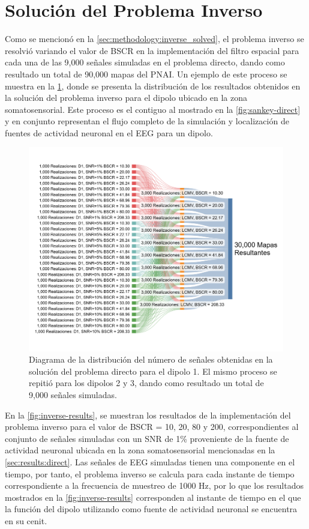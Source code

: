 \section{Solución del Problema Inverso}
\label{sec:results:inverse}

Como se mencionó en la \cref{sec:methodology:inverse_solved}, el problema inverso se resolvió variando el valor de BSCR en la implementación del filtro espacial para cada una de las 9,000 señales simuladas en el problema directo, dando como resultado un total de 90,000 mapas del PNAI.
Un ejemplo de este proceso se muestra en la \cref{fig:sankey-inverse}, donde se presenta la distribución de los resultados obtenidos en la solución del problema inverso para el dipolo ubicado en la zona somatosensorial. 
Este proceso es el contiguo al mostrado en la \cref{fig:sankey-direct} y en conjunto representan el flujo completo de la simulación y localización de fuentes de actividad neuronal en el EEG para un dipolo.

\begin{figure}[!b]
    \centering
    \includegraphics[width=\textwidth]{gfx/sankey-inverse.png}
    \caption{Diagrama de la distribución del número de señales obtenidas en la solución del problema directo para el dipolo 1. El mismo proceso se repitió para los dipolos 2 y 3, dando como resultado un total de 9,000 señales simuladas.}
    \label{fig:sankey-inverse}
\end{figure}

En la \cref{fig:inverse-results}, se muestran los resultados de la implementación del problema inverso para el valor de BSCR = 10, 20, 80 y 200, correspondientes al conjunto de señales simuladas con un SNR de 1\% proveniente de la fuente de actividad neuronal ubicada en la zona somatosensorial mencionadas en la \cref{sec:results:direct}.
Las señales de EEG simuladas tienen una componente en el tiempo, por tanto, el problema inverso se calcula para cada instante de tiempo correspondiente a la frecuencia de muestreo de 1000 Hz, por lo que los resultados mostrados en la \cref{fig:inverse-results} corresponden al instante de tiempo en el que la función del dipolo utilizando como fuente de actividad neuronal se encuentra en su cenit.

